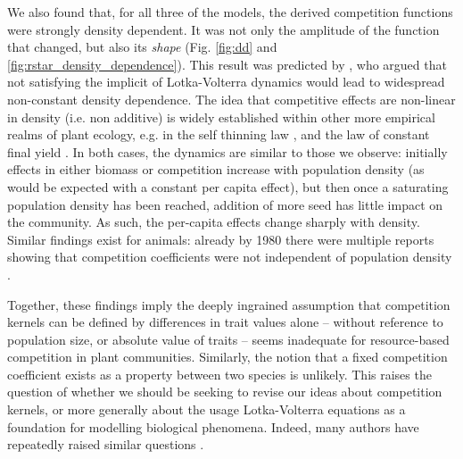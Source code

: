 \documentclass[a4paper,11pt]{article}
\begin{document}
We also found that, for all three of the models, the derived
competition functions were strongly density dependent. It was not only
the amplitude of the function that changed, but also its \emph{shape}
(Fig. \ref{fig:dd} and \ref{fig:rstar_density_dependence}).
%
This result was predicted by \citet{Abrams-1980}, who argued that not
satisfying the implicit of Lotka-Volterra dynamics would lead to
widespread non-constant density dependence. The idea that competitive
effects are non-linear in density (i.e. non additive) is widely
established within other more empirical realms of plant ecology, e.g.
in the self thinning law \citep{Westoby-1984}, and the law of constant
final yield \citep{Weiner-2010}.
In both cases, the dynamics are similar to those we observe: initially
effects in either biomass or competition increase with population
density (as would be expected with a constant per capita effect), but
then once a saturating population density has been reached, addition
of more seed has little impact on the community. As such, the
per-capita effects change sharply with density. Similar findings exist
for animals: already by 1980 there were multiple reports showing that
competition coefficients were not independent of population density
\citep{Abrams-1980}.

Together, these findings imply the deeply ingrained assumption that
competition kernels can be defined by differences in trait values
alone -- without reference to population size, or absolute value of
traits -- seems inadequate for resource-based competition in plant
communities.
%
Similarly, the notion that a fixed competition coefficient exists as a
property between two species is unlikely. This raises the question of
whether we should be seeking to revise our ideas about competition
kernels, or more generally about the usage Lotka-Volterra equations as
a foundation for modelling biological phenomena.  Indeed, many authors
have repeatedly raised similar questions \citep[e.g.][]{Andrewartha-1953,
  Neill-1974, Abrams-1975, Wangersky-1978,Abrams-1980, Tilman-1987,
  Abrams-2008}.
\end{document}
